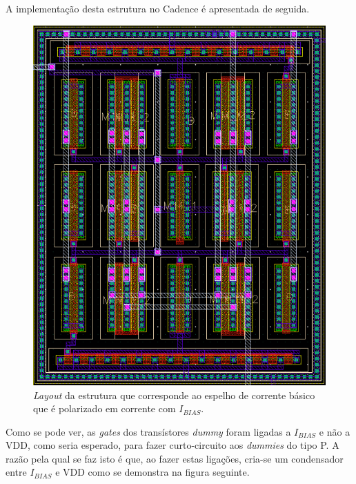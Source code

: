 \documentclass[11pt]{article}
\numberwithin{equation}{section}
\begin{document}
A implementação desta estrutura no Cadence é apresentada de seguida.

\begin{figure}[H]
	\centering
	\includegraphics[keepaspectratio=true, scale=0.65]{exps/layout/espelhodecorrente}
	\vspace{-0.5em}
	\caption{\textit{Layout} da estrutura que corresponde ao espelho de corrente básico que é polarizado em corrente com $I_{BIAS}$.}
	\vspace{-0.8em}
\end{figure}

Como se pode ver, as \textit{gates} dos transístores \textit{dummy} foram ligadas a $I_{BIAS}$ e não a VDD, como seria esperado, para fazer curto-circuito aos \textit{dummies} do tipo P. A razão pela qual se faz isto é que, ao fazer estas ligações, cria-se um condensador entre $I_{BIAS}$ e VDD como se demonstra na figura seguinte.
\end{document}
